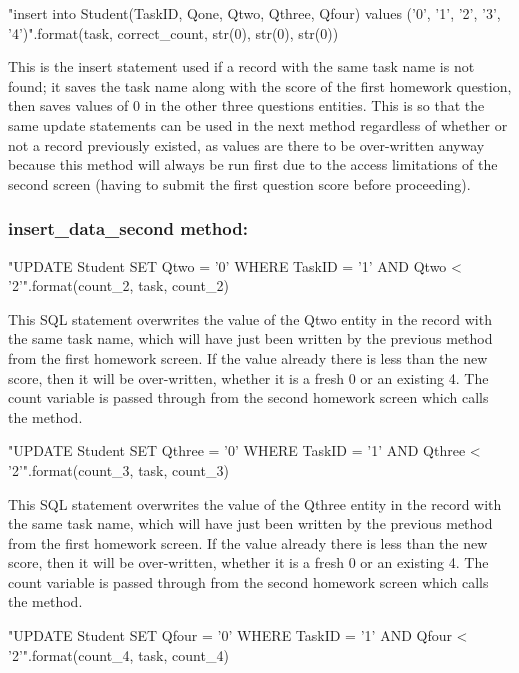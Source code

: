 \begin{python}
"insert into Student(TaskID, Qone, Qtwo, Qthree, Qfour) values ('{0}', '{1}', '{2}', '{3}', '{4}')".format(task, correct_count, str(0), str(0), str(0))
\end{python}

This is the insert statement used if a record with the same task name is not found; it saves the task name along with the score of the first homework question, then saves values of 0 in the other three questions entities. This is so that the same update statements can be used in the next method regardless of whether or not a record previously existed, as values are there to be over-written anyway because this method will always be run first due to the access limitations of the second screen (having to submit the first question score before proceeding).

\subsubsection{insert\_data\_second method: }

\begin{python}
"UPDATE Student SET Qtwo = '{0}' WHERE TaskID = '{1}' AND Qtwo < '{2}'".format(count_2, task, count_2)
\end{python}

This SQL statement overwrites the value of the Qtwo entity in the record with the same task name, which will have just been written by the previous method from the first homework screen. If the value already there is less than the new score, then it will be over-written, whether it is a fresh 0 or an existing 4. The count variable is passed through from the second homework screen which calls the method.

\begin{python}
"UPDATE Student SET Qthree = '{0}' WHERE TaskID = '{1}' AND Qthree < '{2}'".format(count_3, task, count_3)
\end{python}

This SQL statement overwrites the value of the Qthree entity in the record with the same task name, which will have just been written by the previous method from the first homework screen. If the value already there is less than the new score, then it will be over-written, whether it is a fresh 0 or an existing 4. The count variable is passed through from the second homework screen which calls the method.

\begin{python}
"UPDATE Student SET Qfour = '{0}' WHERE TaskID = '{1}' AND Qfour < '{2}'".format(count_4, task, count_4)
\end{python}


